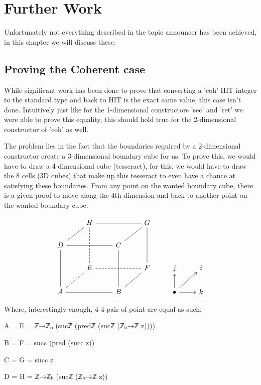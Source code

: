 \chapter{Further Work}
\label{ch:further}

Unfortunately not everything described in the topic announcer has been achieved, in this chapter we will discuss these.

\section{Proving the Coherent case}
While significant work has been done to prove that converting a 'coh' HIT integer to the standard type and back to HIT is the exact same value, this case isn't done. Intuitively just like for the 1-dimensional constructors 'sec' and 'ret' we were able to prove this equality, this should hold true for the 2-dimensional constructor of 'coh' as well.

The problem lies in the fact that the boundaries required by a 2-dimensional constructor create a 3-dimensional boundary cube for us. To prove this, we would have to draw a 4-dimensional cube (tesseract), for this, we would have to draw the 8 cells (3D cubes) that make up this tesseract to even have a chance at satisfying these boundaries. From any point on the wanted boundary cube, there is a given proof to move along the 4th dimension and back to another point on the wanted boundary cube.

\[\begin{tikzcd}
	& H && G \\
	D && C \\
	& E && F & j & i \\
	A && B && \bullet & k
	\arrow[no head, from=1-2, to=1-4]
	\arrow[no head, from=2-1, to=1-2]
	\arrow[no head, from=2-1, to=2-3]
	\arrow[no head, from=2-3, to=1-4]
	\arrow[dashed, no head, from=3-2, to=1-2]
	\arrow[dashed, no head, from=3-2, to=3-4]
	\arrow[no head, from=3-4, to=1-4]
	\arrow[no head, from=4-1, to=2-1]
	\arrow[dashed, no head, from=4-1, to=3-2]
	\arrow[no head, from=4-1, to=4-3]
	\arrow[no head, from=4-3, to=2-3]
	\arrow[no head, from=4-3, to=3-4]
	\arrow[from=4-5, to=3-5]
	\arrow[from=4-5, to=3-6]
	\arrow[from=4-5, to=4-6]
\end{tikzcd}\]

Where, interestingly enough, 4-4 pair of point are equal as such:
\begin{compactitem}
  \item A = E = ℤ→ℤₕ (sucℤ (predℤ (sucℤ (ℤₕ→ℤ z))))
  \item B = F = succ (pred (succ z))
  \item C = G = succ z
  \item D = H = ℤ→ℤₕ (sucℤ (ℤₕ→ℤ z))
\end{compactitem}

